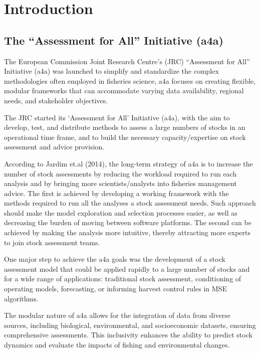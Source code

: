 \documentclass[
]{book}
\begin{document}
\hypertarget{introduction}{%
\chapter{Introduction}\label{introduction}}

\hypertarget{the-assessment-for-all-initiative-a4a}{%
\section{The ``Assessment for All'' Initiative (a4a)}\label{the-assessment-for-all-initiative-a4a}}

The European Commission Joint Research Centre's (JRC) ``Assessment for All'' Initiative (a4a) was launched to simplify and standardize the complex methodologies often employed in fisheries science, a4a focuses on creating flexible, modular frameworks that can accommodate varying data availability, regional needs, and stakeholder objectives.

The JRC started its `Assessment for All' Initiative (a4a), with the aim to develop, test, and distribute methods to assess a large numbers of stocks in an operational time frame, and to build the necessary capacity/expertise on stock assessment and advice provision.

According to Jardim et.al (2014), the long-term strategy of a4a is to increase the number of stock assessments by reducing the workload required to run each analysis and by bringing more scientists/analysts into fisheries management advice. The first is achieved by developing a working framework with the methods required to run all the analyses a stock assessment needs. Such approach should make the model exploration and selection processes easier, as well as decreasing the burden of moving between software platforms. The second can be achieved by making the analysis more intuitive, thereby attracting more experts to join stock assessment teams.

One major step to achieve the a4a goals was the development of a stock assessment model that could be applied rapidly to a large number of stocks and for a wide range of applications: traditional stock assessment, conditioning of operating models, forecasting, or informing harvest control rules in MSE algorithms.

The modular nature of a4a allows for the integration of data from diverse sources, including biological, environmental, and socioeconomic datasets, ensuring comprehensive assessments. This inclusivity enhances the ability to predict stock dynamics and evaluate the impacts of fishing and environmental changes.
\end{document}
